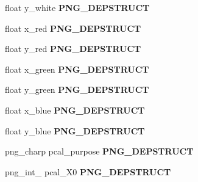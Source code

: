 \begin{DoxyCompactItemize}
\item 
float y\+\_\+white {\bfseries P\+N\+G\+\_\+\+D\+E\+P\+S\+T\+R\+U\+CT}\hypertarget{structpng__info__struct_a1e71c34d319cd110c6b4c200655fbcb6}{}\label{structpng__info__struct_a1e71c34d319cd110c6b4c200655fbcb6}

\item 
float x\+\_\+red {\bfseries P\+N\+G\+\_\+\+D\+E\+P\+S\+T\+R\+U\+CT}\hypertarget{structpng__info__struct_a689d458c150c4b475876d4779a7434cc}{}\label{structpng__info__struct_a689d458c150c4b475876d4779a7434cc}

\item 
float y\+\_\+red {\bfseries P\+N\+G\+\_\+\+D\+E\+P\+S\+T\+R\+U\+CT}\hypertarget{structpng__info__struct_a8a345408720e441070871fce9ebc703a}{}\label{structpng__info__struct_a8a345408720e441070871fce9ebc703a}

\item 
float x\+\_\+green {\bfseries P\+N\+G\+\_\+\+D\+E\+P\+S\+T\+R\+U\+CT}\hypertarget{structpng__info__struct_a8c07cf0d15c911d75f7959a69ca0c451}{}\label{structpng__info__struct_a8c07cf0d15c911d75f7959a69ca0c451}

\item 
float y\+\_\+green {\bfseries P\+N\+G\+\_\+\+D\+E\+P\+S\+T\+R\+U\+CT}\hypertarget{structpng__info__struct_a70e2c9e98b55530ea4c9b548da0fae6a}{}\label{structpng__info__struct_a70e2c9e98b55530ea4c9b548da0fae6a}

\item 
float x\+\_\+blue {\bfseries P\+N\+G\+\_\+\+D\+E\+P\+S\+T\+R\+U\+CT}\hypertarget{structpng__info__struct_a9bd9a4ee6fd891c203af5aeb1e00f8da}{}\label{structpng__info__struct_a9bd9a4ee6fd891c203af5aeb1e00f8da}

\item 
float y\+\_\+blue {\bfseries P\+N\+G\+\_\+\+D\+E\+P\+S\+T\+R\+U\+CT}\hypertarget{structpng__info__struct_ad4bd797dc49d35b59a16f3e483052e73}{}\label{structpng__info__struct_ad4bd797dc49d35b59a16f3e483052e73}

\item 
png\+\_\+charp pcal\+\_\+purpose {\bfseries P\+N\+G\+\_\+\+D\+E\+P\+S\+T\+R\+U\+CT}\hypertarget{structpng__info__struct_a897b74a81f216922a9f74adc350c8680}{}\label{structpng__info__struct_a897b74a81f216922a9f74adc350c8680}

\item 
png\+\_\+int\+\_ pcal\+\_\+\+X0 {\bfseries P\+N\+G\+\_\+\+D\+E\+P\+S\+T\+R\+U\+CT}\hypertarget{structpng__info__struct_a804b2c2fdc78a14a2d71eb4d7a331c2a}{}\label{structpng__info__struct_a804b2c2fdc78a14a2d71eb4d7a331c2a}


\end{DoxyCompactItemize}
